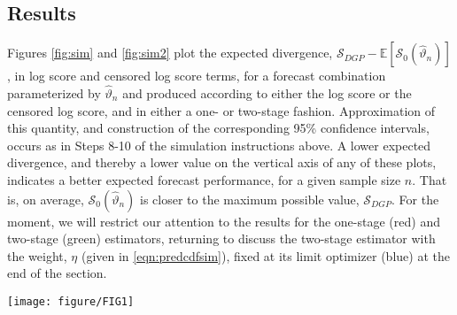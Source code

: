 \documentclass[12pt]{article}
\theoremstyle{definition}
\theoremstyle{remark}
\begin{document}
\subsection{Results}

Figures \ref{fig:sim} and \ref{fig:sim2} plot the expected divergence, $\mathcal{S}_{DGP} - \mathbb{E}[\mathcal{S}_0(\hat{\vartheta}_n)]$, in log score and censored log score terms, for a forecast combination parameterized by $\hat{\vartheta}_n$ and produced according to either the log score or the censored log score, and in either a one- or two-stage fashion. Approximation of this quantity, and construction of the corresponding 95\% confidence intervals, occurs as in Steps 8-10 of the simulation instructions above. A lower expected divergence, and thereby a lower value on the vertical axis of any of these plots, indicates a better expected forecast performance, for a given sample size $n$. That is, on average, $\mathcal{S}_0(\hat{\vartheta}_n)$ is closer to the maximum possible value, $\mathcal{S}_{DGP}$. For the moment, we will restrict our attention to the results for the one-stage (red) and two-stage (green) estimators, returning to discuss the two-stage estimator with the weight, $\eta$ (given in \eqref{eqn:predcdfsim}), fixed at its limit optimizer (blue) at the end of the section.

\begin{figure*}[t]
\texttt{[image: figure/FIG1]}
\caption{The expectation of the difference between the out-of-sample one-step-ahead forecast performance of a misspecified forecast combination and that of the true DGP, over a range of sample sizes. \cite{Gneiting2007} call this quantity the expected divergence. The forecast combination is optimized in a one-stage fashion (red), a two-stage fashion (green) or in a way that comprises the first stage of the two-stage combination, followed by a fixed combination at $\tilde{\eta}_n = \eta^{\star}$ (blue). Parameters are optimized according to the log score (A and C, first column) or a censored log score that prioritizes accuracy in the lower 20\% tail of the forecast distribution (B and D, second column). The divergence is measured on the vertical axes according to the log score (A and B, first row) or the censored log score (C and D, second row). The expectations and confidence intervals are constructed as per Steps 8-10 in the text, with the 95\% confidence bounds appearing as small dashed lines.}
\label{fig:sim}
\end{figure*}
\end{document}
